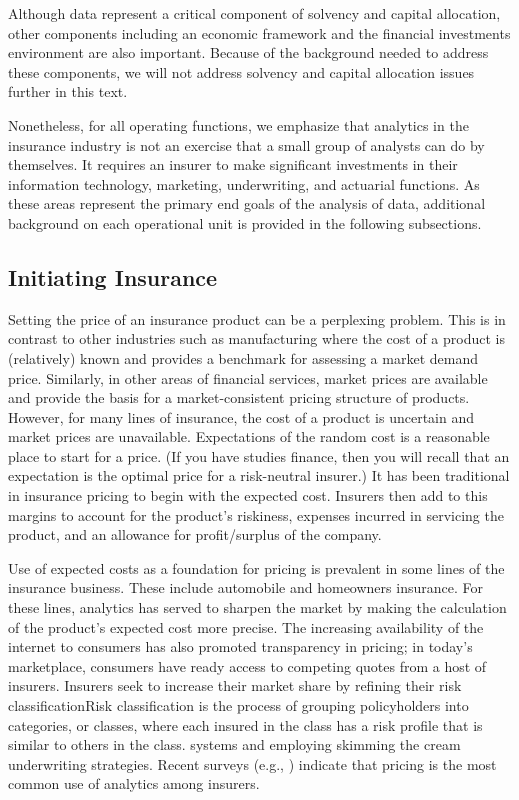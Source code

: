 \documentclass[]{book}
\theoremstyle{definition}
\theoremstyle{definition}
\theoremstyle{definition}
\theoremstyle{remark}
\begin{document}
Although data represent a critical component of solvency and capital
allocation, other components including an economic framework and the
financial investments environment are also important. Because of the
background needed to address these components, we will not address
solvency and capital allocation issues further in this text.

Nonetheless, for all operating functions, we emphasize that analytics in
the insurance industry is not an exercise that a small group of analysts
can do by themselves. It requires an insurer to make significant
investments in their information technology, marketing, underwriting,
and actuarial functions. As these areas represent the primary end goals
of the analysis of data, additional background on each operational unit
is provided in the following subsections.

\subsection{Initiating Insurance}\label{initiating-insurance}

Setting the price of an insurance product can be a perplexing problem.
This is in contrast to other industries such as manufacturing where the
cost of a product is (relatively) known and provides a benchmark for
assessing a market demand price. Similarly, in other areas of financial
services, market prices are available and provide the basis for a
market-consistent pricing structure of products. However, for many lines
of insurance, the cost of a product is uncertain and market prices are
unavailable. Expectations of the random cost is a reasonable place to
start for a price. (If you have studies finance, then you will recall
that an expectation is the optimal price for a risk-neutral insurer.) It
has been traditional in insurance pricing to begin with the expected
cost. Insurers then add to this margins to account for the product's
riskiness, expenses incurred in servicing the product, and an allowance
for profit/surplus of the company.

Use of expected costs as a foundation for pricing is prevalent in some
lines of the insurance business. These include automobile and homeowners
insurance. For these lines, analytics has served to sharpen the market
by making the calculation of the product's expected cost more precise.
The increasing availability of the internet to consumers has also
promoted transparency in pricing; in today's marketplace, consumers have
ready access to competing quotes from a host of insurers. Insurers seek
to increase their market share by refining their risk
classification{Risk classification is the process of grouping
policyholders into categories, or classes, where each insured in the
class has a risk profile that is similar to others in the class.}
systems and employing skimming the cream underwriting strategies. Recent
surveys (e.g., \citet{survey2013}) indicate that pricing is the most
common use of analytics among insurers.
\end{document}
